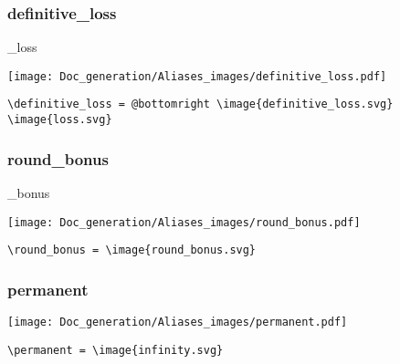 \documentclass{article}
\begin{document}
\subsubsection{definitive\_loss}
\begin{minipage}{0.45\linewidth}
\raggedright
\begin{spverbatim}
_loss
\end{spverbatim}
\end{minipage}
\begin{minipage}{0.45\linewidth}
\raggedleft
\texttt{[image: Doc\_generation/Aliases\_images/definitive\_loss.pdf]}
\end{minipage}
\begin{center}
\begin{BVerbatim}
\definitive_loss = @bottomright \image{definitive_loss.svg} \image{loss.svg}
\end{BVerbatim}
\end{center}

\subsubsection{round\_bonus}
\begin{minipage}{0.45\linewidth}
\raggedright
\begin{spverbatim}
\round_bonus
\end{spverbatim}
\end{minipage}
\begin{minipage}{0.45\linewidth}
\raggedleft
\texttt{[image: Doc\_generation/Aliases\_images/round\_bonus.pdf]}
\end{minipage}
\begin{center}
\begin{BVerbatim}
\round_bonus = \image{round_bonus.svg}
\end{BVerbatim}
\end{center}

\subsubsection{permanent}
\begin{minipage}{0.45\linewidth}
\raggedright
\begin{spverbatim}
\permanent
\end{spverbatim}
\end{minipage}
\begin{minipage}{0.45\linewidth}
\raggedleft
\texttt{[image: Doc\_generation/Aliases\_images/permanent.pdf]}
\end{minipage}
\begin{center}
\begin{BVerbatim}
\permanent = \image{infinity.svg}
\end{BVerbatim}
\end{center}
\end{document}
